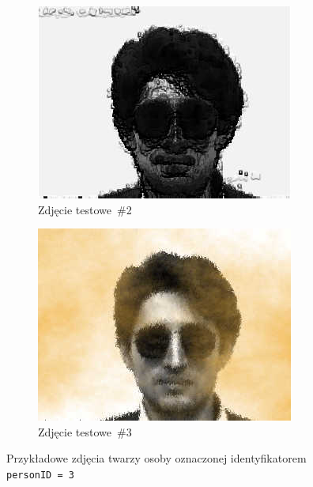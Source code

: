 \documentclass[a4paper,titlepage]{article}
\theoremstyle{break}
\numberwithin{equation}{subsection}
\begin{document}
\begin{figure}[H]
\begin{subfigure}[b]{0.3\textwidth}
		\includegraphics[width=\textwidth]{img/yale-faces/modified-subject03-glasses-3}
		\caption{Zdjęcie testowe~\#2}
		\label{fig:mouse}
	\end{subfigure}
	\begin{subfigure}[b]{0.3\textwidth}
		\includegraphics[width=\textwidth]{img/yale-faces/modified-subject03-glasses-4}
		\caption{Zdjęcie testowe~\#3}
		\label{fig:mouse}
	\end{subfigure}
	\caption{Przykładowe zdjęcia twarzy osoby oznaczonej identyfikatorem \texttt{personID~=~3}}\label{fig:osoby}
\end{figure}

\end{document}
